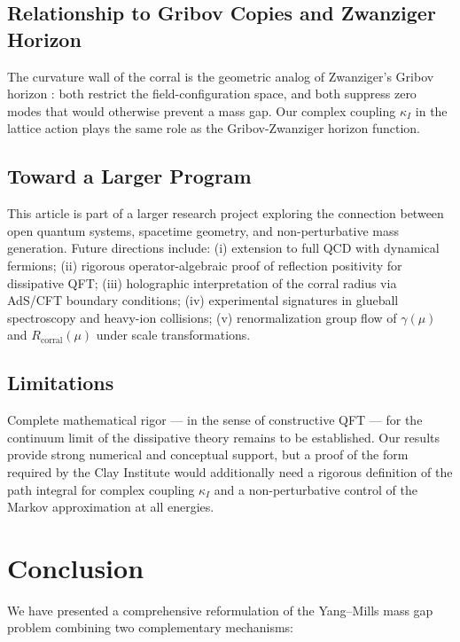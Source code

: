 \documentclass[aps,prd,reprint,superscriptaddress,floatfix]{revtex4-2}
\theoremstyle{definition}
\newcommand{\corr}{_{\mathrm{corral}}}
\begin{document}
\subsection{Relationship to Gribov Copies and Zwanziger Horizon}

The curvature wall of the corral is the geometric analog of Zwanziger's
Gribov horizon \cite{Zwanziger1989}: both restrict the field-configuration
space, and both suppress zero modes that would otherwise prevent a mass gap.
Our complex coupling $\kappa_I$ in the lattice action plays the same role as
the Gribov-Zwanziger horizon function.

\subsection{Toward a Larger Program}

This article is part of a larger research project exploring the connection
between open quantum systems, spacetime geometry, and non-perturbative mass
generation. Future directions include: (i) extension to full QCD with
dynamical fermions; (ii) rigorous operator-algebraic proof of reflection
positivity for dissipative QFT; (iii) holographic interpretation of the
corral radius via AdS/CFT boundary conditions; (iv) experimental signatures
in glueball spectroscopy and heavy-ion collisions; (v) renormalization group
flow of $\gamma(\mu)$ and $R\corr(\mu)$ under scale transformations.

\subsection{Limitations}

Complete mathematical rigor — in the sense of constructive QFT — for the
continuum limit of the dissipative theory remains to be established. Our
results provide strong numerical and conceptual support, but a proof of the
form required by the Clay Institute would additionally need a rigorous
definition of the path integral for complex coupling $\kappa_I$ and a
non-perturbative control of the Markov approximation at all energies.

\section{Conclusion}
\label{sec:conclusion}

We have presented a comprehensive reformulation of the Yang--Mills mass gap
problem combining two complementary mechanisms:
\end{document}
